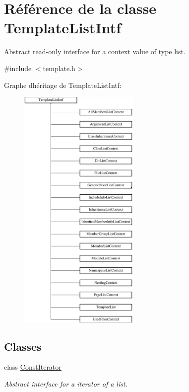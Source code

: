 \hypertarget{class_template_list_intf}{}\section{Référence de la classe Template\+List\+Intf}
\label{class_template_list_intf}


Abstract read-\/only interface for a context value of type list.  




{\ttfamily \#include $<$template.\+h$>$}

Graphe d\textquotesingle{}héritage de Template\+List\+Intf\+:\begin{figure}[H]
\begin{center}
\leavevmode
\includegraphics[height=12.000000cm]{class_template_list_intf}
\end{center}
\end{figure}
\subsection*{Classes}
\begin{DoxyCompactItemize}
\item 
class \hyperlink{class_template_list_intf_1_1_const_iterator}{Const\+Iterator}
\begin{DoxyCompactList}\small\item\em Abstract interface for a iterator of a list. \end{DoxyCompactList}\end{DoxyCompactItemize}
